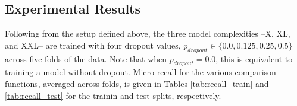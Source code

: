 




\subsection{Experimental Results}
\label{subsec:quantitative_results}

Following from the setup defined above, the three model complexities --X, XL, and XXL-- are trained with four dropout values, $p_{dropout} \in \{0.0, 0.125, 0.25, 0.5\}$ across five folds of the data.
Note that when $p_{dropout} = 0.0$, this is equivalent to training a model without dropout.
Micro-recall for the various comparison functions, averaged across folds, is given in Tables \ref{tab:recall_train} and \ref{tab:recall_test} for the trainin and test splits, respectively.


